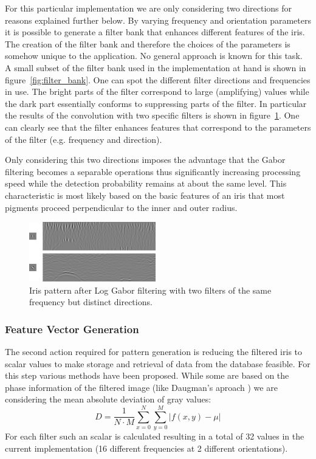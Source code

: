 \documentclass[journal]{IEEEtran}
\begin{document}
\par For this particular implementation we are only considering two directions for reasons explained further below. By varying frequency and orientation parameters it is possible to generate a filter bank that enhances different features of the iris. The creation of the filter bank and therefore the choices of the parameters is somehow unique to the application. No general approach is known for this task. 
A small subset of the filter bank used in the implementation at hand is shown in figure~\ref{fig:filter_bank}. One can spot the different filter directions and frequencies in use. The bright parts of the filter correspond to large (amplifying) values while the dark part essentially conforms to suppressing parts of the filter. In particular the results of the convolution with two specific filters is shown in figure~\ref{fig:convolution_result}. One can clearly see that the filter enhances features that correspond to the parameters of the filter (e.g. frequency and direction).
\par Only considering this two directions imposes the advantage that the Gabor filtering becomes a separable operations thus significantly increasing processing speed while the detection probability remains at about the same level. This characteristic is most likely based on the basic features of an iris that most pigments proceed perpendicular to the inner and outer radius.

\begin{figure}[t]
	\centering
  \includegraphics[width=0.49\textwidth]{iris/pattern_gen.png}
	\caption{Iris pattern after Log Gabor filtering with two filters of the same frequency but distinct directions.}
	\label{fig:convolution_result}
\end{figure}


\subsubsection{Feature Vector Generation}
The second action required for pattern generation is reducing the filtered iris to scalar values to make storage and retrieval of data from the database feasible. For this step various methods have been proposed. While some are based on the phase information of the filtered image (like Daugman's aproach  \cite{daugman2004iris}) we are considering the mean absolute deviation of gray values:
\[
D = \frac{1}{N\cdot M} \sum \limits_{x=0}^N \sum \limits_{y=0}^M |f(x,y) - \mu|
\]
For each filter such an scalar is calculated resulting in a total of 32 values in the current implementation (16 different frequencies at 2 different orientations).
\end{document}
